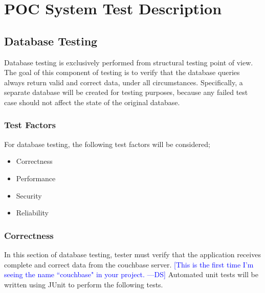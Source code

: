 \documentclass[12pt]{article}
\newcommand{\authornote}[3]{\textcolor{#1}{[#3 ---#2]}}
\newcommand{\authornote}[3]{}
\newcommand{\ds}[1]{\authornote{blue}{DS}{#1}}
\begin{document}
%
%

\section{POC System Test Description}

\subsection{Database Testing}
Database testing is exclusively performed from structural testing point of view. The goal of this component of testing is to verify that the database queries always return valid and correct data, under all circumstances. Specifically, a separate database will be created for testing purposes, because any failed test case should not affect the state of the original database. 
\subsubsection{Test Factors}
For database testing, the following test factors will be considered;
\begin{itemize}
 \item Correctness
 \item Performance
 \item Security
 \item Reliability
 \end{itemize}
 
\subsubsection{Correctness}
In this section of database testing, tester must verify that the application receives complete and correct data from the couchbase server.
\ds{This is the first time I'm seeing the name ``couchbase" in your project.}
Automated unit tests will be written using JUnit to perform the following tests.
\end{document}
